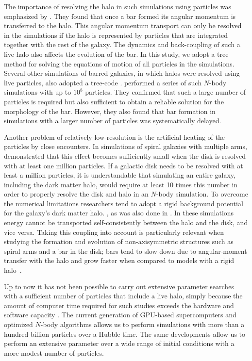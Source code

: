 The importance of resolving the halo in such simulations
using particles was emphasized by \citet{2002ApJ...569L..83A}. They
found that once a bar formed its angular momentum is transferred to
the halo. This angular momentum transport can only be resolved in the
simulations if the halo is represented by particles that are
integrated together with the rest of the galaxy. The dynamics and
back-coupling of such a live halo also affects the evolution of the
bar.  In this study, we adopt a tree method
\citep{1986Natur.324..446B} for solving the equations of motion of all
particles in the simulations.  Several other simulations of barred
galaxies, in which halos were resolved using live particles, also
adopted a tree-code \citep{2005ApJ...631..838W,2008ApJ...679.1239W}.
\citet{2009ApJ...697..293D} performed a series of such $N$-body
simulations with up to $10^8$ particles. They confirmed that such a
large number of particles is required but also sufficient to obtain a
reliable solution for the morphology of the bar.  However, they
also found that bar formation in simulations with a larger number of
particles was systematically delayed.

Another problem of relatively low-resolution is the artificial heating
of the particles by close encounters.  In simulations of spiral
galaxies with multiple arms, \citet{2011ApJ...730..109F} demonstrated that
this effect becomes sufficiently small when the disk is resolved with
at least one million particles.  If a galactic disk needs to be
resolved with at least a million particles, it is understandable that
simulating an entire galaxy, including the dark matter halo, would
require at least 10 times this number in order to properly resolve the
disk and halo in an $N$-body simulation.  To overcome the numerical
limitations researchers tend to adopt a rigid background potential for
the galaxy's dark matter halo.
\citep[e.g.,][]{1984ApJ...282...61S,2013ApJ...763...46B,
  2013A&A...553A..77G}, as was also done in
\citet{2011ApJ...730..109F}.  In these simulations energy cannot be
transported self-consistently between the halo and the
disk, and vice versa.  Taking this coupling into account is
particularly relevant when studying the formation and evolution of
non-axisymmetric structures such as spiral arms and a bar in the disk;
bars tend to slow down due to angular-moment transfer with the halo
and grow faster when compared to models with a rigid
halo~\citep{2002ApJ...569L..83A}.

Up to now it has not been possible to carry out extensive parameter
searches with a sufficient number of particles that include a live
halo, simply because the amount of computer time required for such
studies exceeds the hardware and software capacity
\citep[e.g.][]{2009ApJ...697..293D}.  The current generation of
GPU-based supercomputers and optimized $N$-body algorithms
\cite{7328651} allows us to perform simulations with more than a
hundred billion particles \citep{2014hpcn.conf...54B} over a Hubble
time. The same developments allow us to perform an extensive parameter
over a wide range of initial conditions with a more modest number of
particles.

